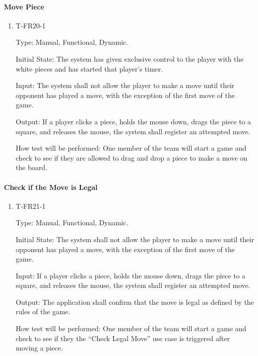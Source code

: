\documentclass[12pt, titlepage]{article}
\begin{document}
    \paragraph{Move Piece}

        \begin{enumerate}

        \item{T-FR20-1\\}

            Type: Manual, Functional, Dynamic.
            					
            Initial State: The system has given exclusive control to the player with the white pieces and has started that player’s timer.
            					
            Input: The system shall not allow the player to make a move until their opponent has played a move,
            with the exception of the first move of the game.
            					
            Output: If a player clicks a piece, holds the mouse down, drags the piece to a square, and releases the mouse, the system shall register an attempted move.

            How test will be performed: One member of the team will start a game and check to see if they are allowed to drag and drop a piece to make a move on the board.

        \end{enumerate}

    \paragraph{Check if the Move is Legal}

        \begin{enumerate}

        \item{T-FR21-1\\}

            Type: Manual, Functional, Dynamic.
            					
            Initial State: The system shall not allow the player to make a move until their opponent has played a move, with the exception of the first move of the game.
            					
            Input: If a player clicks a piece, holds the mouse down, drags the piece to a square, and releases the mouse, the system shall register an attempted move.
            					
            Output: The application shall confirm that the move is legal as defined by the rules of the game.

            How test will be performed: One member of the team will start a game and check to see if they the ``Check Legal Move'' use case is triggered after moving a piece.

        \end{enumerate}
\end{document}
